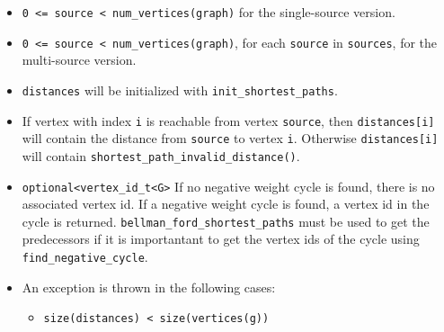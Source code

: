 \begin{itemdescr}
      \pnum\mandates
            \begin{itemize}
                  \item
                        \lstinline{0 <= source < num_vertices(graph)} for the single-source version. 
                  \item
                        \lstinline{0 <= source < num_vertices(graph)}, for each \lstinline{source} in \lstinline{sources}, 
                                   for the multi-source version.
            \end{itemize}
      \pnum\preconditions
            \begin{itemize}
                  \item
                        \lstinline{distances} will be initialized with \lstinline{init_shortest_paths}.
            \end{itemize}
      \pnum\effects
            \begin{itemize}
                  \item
                        If vertex with index \lstinline{i} is reachable from vertex \lstinline{source}, then
                        \lstinline{distances[i]} will contain the distance from \lstinline{source} to vertex
                        \lstinline{i}.  Otherwise \lstinline{distances[i]} will contain
                        \lstinline{shortest_path_invalid_distance()}.
            \end{itemize}
      \pnum\returns 
      \begin{itemize}
            \item \lstinline{optional<vertex_id_t<G>} If no negative weight cycle is found, 
                  there is no associated vertex id. If a negative weight cycle is found, a
                  vertex id in the cycle is returned. \lstinline{bellman_ford_shortest_paths} must be used
                  to get the predecessors if it is importantant to get the vertex ids of the cycle
                  using \lstinline{find_negative_cycle}.
      \end{itemize}
\pnum\throws 
            \begin{itemize}
                  \item An  exception is thrown in the following cases:
                        \begin{itemize}
                              \item \lstinline{size(distances) < size(vertices(g))}

\end{itemize}
\end{itemize}
\end{itemdescr}
